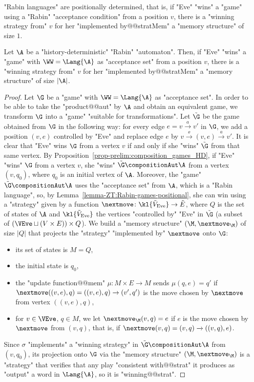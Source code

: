 \documentclass[10pt,a4paper]{amsart}
\renewcommand{\ss}{\sigma}
\newcommand{\re}[1]{\xrightarrow{#1}}
\newcommand{\Eve}{\mathrm{Eve}}
\begin{document}
\begin{lemma}\label{lemma-ZT:Rabin-games-positional}
	"Rabin languages" are positionally determined, that is, if "Eve" "wins" a "game" using a "Rabin" "acceptance condition" from a position $v$, there is a "winning strategy from" $v$ for her "implemented by@@stratMem" a "memory structure" of size $1$. 
\end{lemma}

\begin{corollary}\label{cor-ZT:HD-Rabin-memory}
	Let $\A$ be a "history-deterministic" "Rabin" "automaton". Then, if "Eve" "wins" a "game" with $\WW = \Lang{\A}$ as "acceptance set" from a position $v$, there is a "winning strategy from" $v$ for her "implemented by@@stratMem" a "memory structure" of size $|\A|$.
\end{corollary}
\begin{proof}
	Let $\G$ be a "game" with $\WW = \Lang{\A}$ as "acceptance set". In order to be able to take the "product@@aut" by $\A$ and obtain an equivalent game, we transform $\G$ into a "game" "suitable for transformations". Let $\tilde{\G}$ be the game obtained from $\G$ in the following way: for every edge $e = v\re{a} v'$ in $\G$, we add a position $(v,e)$ controlled by "Eve" and replace edge $e$ by $v\re{\ee} (v,e) \re{a} v'$. It is clear that "Eve" wins $\G$ from a vertex $v$ if and only if she "wins" $\tilde{\G}$ from that same vertex.
	By Proposition~\ref{prop-prelim:composition_games_HD}, if "Eve" "wins" $\G$ from a vertex $v$, she "wins" $\tilde{\G} \compositionAut \A$ from a vertex $(v,q_0)$, where $q_0$ is an initial vertex of $\A$. Moreover, the "game" $\tilde{\G} \compositionAut \A$ uses the "acceptance set" from $\A$, which is a "Rabin language", so, by Lemma~\ref{lemma-ZT:Rabin-games-positional}, she can win using a "strategy" given by a function $\nextmove\colon \kl{\tilde{V}_\Eve}  \to \tilde{E}$, where $Q$ is the set of states of $\A$ and $\kl{\tilde{V}_\Eve}$ the vertices "controlled by" "Eve" in $\tilde{\G}$ (a subset of $(\VEve \sqcup (V\times E))\times Q$).
	We build a "memory structure" $(\M, \nextmove_\M)$  of size $|Q|$ that projects the "strategy" "implemented by" $\nextmove$ onto $\G$:	
	\begin{itemize}
		\item its set of states is $M=Q$,
		\item the initial state is $q_0$,
		\item the "update function@@mem" $\mu\colon M \times E \to M$ sends $\mu(q,e) = q'$ if $\nextmove((v,e),q) = ((v,e),q) \re{} (v',q')$ is the move chosen by $\nextmove$ from vertex $((v,e),q)$,
		\item for $v\in \VEve$, $q\in M$, we let $\nextmove_\M(v,q) = e$ if $e$ is the move chosen by $\nextmove$ from $(v,q)$, that is, if $\nextmove(v,q) = (v,q) \re{} ((v,q),e)$.
	\end{itemize}
Since $\ss$ "implements" a "winning strategy" in $\tilde{\G}\compositionAut \A$ from $(v,q_0)$, its projection onto $\G$ via the "memory structure" $(\M, \nextmove_\M)$ is a "strategy" that verifies that any play "consistent with@@strat" it produces as "output" a word in $\Lang{\A}$, so it is "winning@@strat".
\end{proof}
\end{document}
